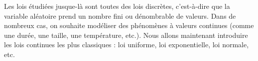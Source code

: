 Les lois étudiées jusque-là sont toutes des lois discrètes, c’est-à-dire que la variable aléatoire prend un nombre fini ou dénombrable de valeurs.  
Dans de nombreux cas, on souhaite modéliser des phénomènes à valeurs continues (comme une durée, une taille, une température, etc.).  
Nous allons maintenant introduire les lois continues les plus classiques : loi uniforme, loi exponentielle, loi normale, etc.

